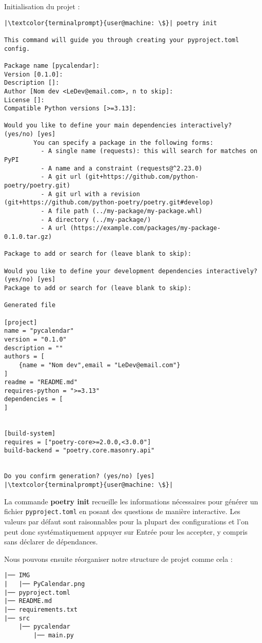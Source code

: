 Initialisation du projet :
\begin{lstlisting}[style=terminal]
|\textcolor{terminalprompt}{user@machine: \$}| poetry init

This command will guide you through creating your pyproject.toml config.

Package name [pycalendar]:
Version [0.1.0]:
Description []:
Author [Nom dev <LeDev@email.com>, n to skip]:
License []:
Compatible Python versions [>=3.13]:

Would you like to define your main dependencies interactively? (yes/no) [yes]
        You can specify a package in the following forms:
          - A single name (requests): this will search for matches on PyPI
          - A name and a constraint (requests@^2.23.0)
          - A git url (git+https://github.com/python-poetry/poetry.git)
          - A git url with a revision         (git+https://github.com/python-poetry/poetry.git#develop)
          - A file path (../my-package/my-package.whl)
          - A directory (../my-package/)
          - A url (https://example.com/packages/my-package-0.1.0.tar.gz)

Package to add or search for (leave blank to skip):

Would you like to define your development dependencies interactively? (yes/no) [yes]
Package to add or search for (leave blank to skip):

Generated file

[project]
name = "pycalendar"
version = "0.1.0"
description = ""
authors = [
    {name = "Nom dev",email = "LeDev@email.com"}
]
readme = "README.md"
requires-python = ">=3.13"
dependencies = [
]


[build-system]
requires = ["poetry-core>=2.0.0,<3.0.0"]
build-backend = "poetry.core.masonry.api"


Do you confirm generation? (yes/no) [yes]
|\textcolor{terminalprompt}{user@machine: \$}| 
\end{lstlisting}

La commande \textbf{poetry init} recueille les informations nécessaires pour générer un fichier \texttt{pyproject.toml} en posant des questions de manière interactive. Les valeurs par défaut sont raisonnables pour la plupart des configurations et l'on peut donc systématiquement appuyer sur Entrée pour les accepter, y compris sans déclarer de dépendances.

Nous pouvons ensuite réorganiser notre structure de projet comme cela :
\begin{verbatim}
|── IMG
|   |── PyCalendar.png
|── pyproject.toml
|── README.md
|── requirements.txt
|── src
    |── pycalendar
        |── main.py
\end{verbatim}

